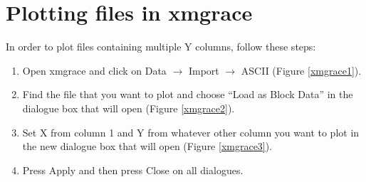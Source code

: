 \documentclass[a4paper,11pt]{scrartcl}
\begin{document}
\begin{thebibliography}{50}
\end{thebibliography}
\clearpage




\appendix
\section{Plotting files in xmgrace}

In order to plot files containing multiple Y columns, follow these steps:

\begin{enumerate}
\item Open xmgrace and click on Data $\rightarrow$ Import $\rightarrow$ ASCII (Figure \ref{xmgrace1}).
\item Find the file that you want to plot and choose ``Load as Block Data'' in the dialogue box that will open (Figure \ref{xmgrace2}).
\item Set X from column 1 and Y from whatever other column you want to plot in the new dialogue box that will open (Figure \ref{xmgrace3}).
\item Press Apply and then press Close on all dialogues.
\end{enumerate}
\end{document}
